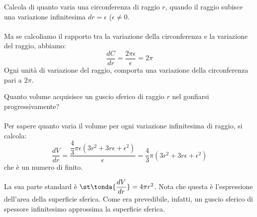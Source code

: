 \begin{esempio}
Calcola di quanto varia una circonferenza di raggio \(r\),
quando il raggio subisce una variazione infinitesima \(dr=\epsilon\) 
(\(\epsilon \ne 0\).\\

\\

Ma se calcoliamo il rapporto tra la variazione 
della circonferenza e la variazione del raggio, abbiamo:
\[\dfrac{dC}{dr}=\dfrac{2\pi \epsilon}{\epsilon}=2\pi\]
Ogni unità di variazione del raggio, comporta una variazione della 
circonferenza pari a \(2\pi\).
\end{esempio}

\begin{esempio}
Quanto volume acquisisce un guscio sferico di raggio \(r\) nel gonfiarsi
progressivamente? \\

\\

Per sapere quanto varia il volume per ogni variazione infinitesima di 
raggio, si calcola:
\[\dfrac{dV}{dr}=
\dfrac{\dfrac{4}{3}\pi \epsilon(3r^2+3r\epsilon+\epsilon^2)}{\epsilon}=
\dfrac{4}{3}\pi (3r^2+3r\epsilon+\epsilon^2)\] 
che è un numero di finito.

La sua parte standard è \(\st\tonda{\dfrac{dV}{dr}}=4\pi r^2\). 
Nota che questa è l'espressione dell'area della superficie sferica. 
Come era prevedibile, infatti, un guscio sferico di spessore infinitesimo 
approssima la superficie sferica.
\end{esempio}

